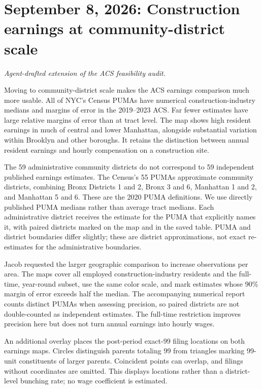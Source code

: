 \clearpage
\section*{September 8, 2026: Construction earnings at community-district scale}
\textit{Agent-drafted extension of the ACS feasibility audit.}

Moving to community-district scale makes the ACS earnings comparison much more
usable. All of NYC's Census PUMAs have numerical construction-industry medians
and margins of error in the 2019--2023 ACS. Far fewer estimates have large
relative margins of error than at tract level. The map shows high resident
earnings in much of central and lower Manhattan, alongside substantial
variation within Brooklyn and other boroughs. It retains the distinction
between annual resident earnings and hourly compensation on a construction site.

The 59 administrative community districts do not correspond to 59 independent
published earnings estimates. The Census's 55 PUMAs approximate community
districts, combining Bronx Districts 1 and 2, Bronx 3 and 6, Manhattan 1 and 2,
and Manhattan 5 and 6. These are the 2020 PUMA definitions. We use directly
published PUMA medians rather than average tract medians. Each administrative
district receives the estimate for the PUMA that explicitly names it, with
paired districts marked on the map and in the saved table. PUMA and district
boundaries differ slightly; these are district approximations, not exact
re-estimates for the administrative boundaries.

Jacob requested the larger geographic comparison to increase observations per
area. The maps cover all employed construction-industry residents and the
full-time, year-round subset, use the same color scale, and mark estimates
whose 90\% margin of error exceeds half the median. The accompanying numerical
report counts distinct PUMAs when assessing precision, so paired districts
are not double-counted as independent estimates. The full-time restriction
improves precision here but does not turn annual earnings into hourly wages.

An additional overlay places the post-period exact-99 filing locations on both
earnings maps. Circles distinguish parents totaling 99 from triangles marking
99-unit constituents of larger parents. Coincident points can overlap, and
filings without coordinates are omitted. This displays locations rather than
a district-level bunching rate; no wage coefficient is estimated.

